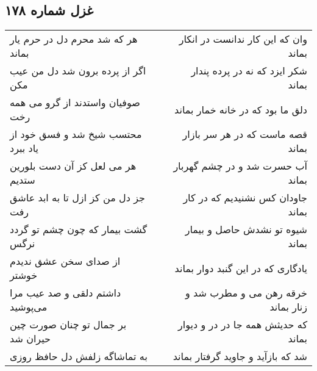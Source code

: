 \begin{center}
\section*{غزل شماره ۱۷۸}
\label{sec:sh178}
\begin{longtable}{l p{0.5cm} r}
هر که شد محرم دل در حرم یار بماند
&&
وان که این کار ندانست در انکار بماند
\\
اگر از پرده برون شد دل من عیب مکن
&&
شکر ایزد که نه در پرده پندار بماند
\\
صوفیان واستدند از گرو می همه رخت
&&
دلق ما بود که در خانه خمار بماند
\\
محتسب شیخ شد و فسق خود از یاد ببرد
&&
قصه ماست که در هر سر بازار بماند
\\
هر می لعل کز آن دست بلورین ستدیم
&&
آب حسرت شد و در چشم گهربار بماند
\\
جز دل من کز ازل تا به ابد عاشق رفت
&&
جاودان کس نشنیدیم که در کار بماند
\\
گشت بیمار که چون چشم تو گردد نرگس
&&
شیوه تو نشدش حاصل و بیمار بماند
\\
از صدای سخن عشق ندیدم خوشتر
&&
یادگاری که در این گنبد دوار بماند
\\
داشتم دلقی و صد عیب مرا می‌پوشید
&&
خرقه رهن می و مطرب شد و زنار بماند
\\
بر جمال تو چنان صورت چین حیران شد
&&
که حدیثش همه جا در در و دیوار بماند
\\
به تماشاگه زلفش دل حافظ روزی
&&
شد که بازآید و جاوید گرفتار بماند
\\
\end{longtable}
\end{center}
